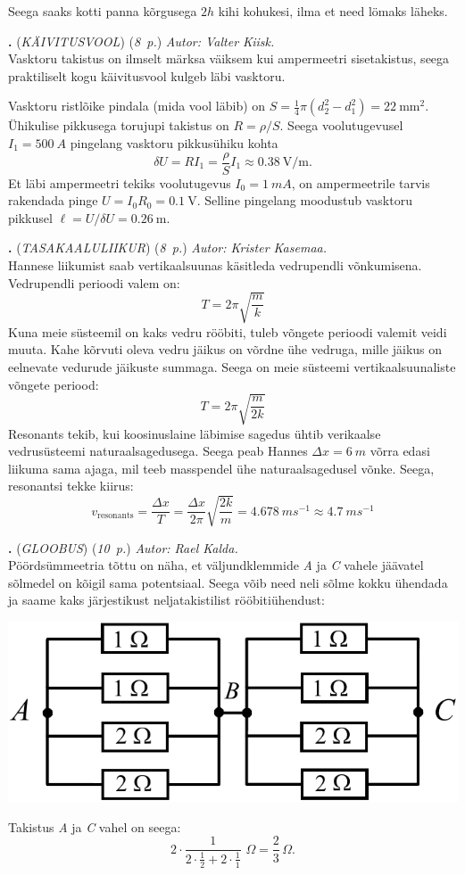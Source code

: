 \documentclass[11pt,a5paper]{article}
\newcommand{\numb}[1]{\vspace{5pt}\textbf{\large #1}}
\newcommand{\nimi}[1]{(\textsl{\small #1})}
\newcommand{\punktid}[1]{(\emph{#1~p.})}
\newcounter{ylesanne}
\newcommand{\yl}[1]{\addtocounter{ylesanne}{1}\numb{\theylesanne.} \nimi{#1} \newblock{}}
\newcommand{\autor}[1]{\emph{ Autor: #1.\\}}
\begin{document}
Seega saaks kotti panna kõrgusega $2h$ kihi kohukesi, ilma et need lömaks läheks.

\yl{KÄIVITUSVOOL}
\punktid{8}
\autor{Valter Kiisk}
Vasktoru takistus on ilmselt märksa väiksem kui ampermeetri sisetakistus, seega praktiliselt kogu käivitusvool kulgeb läbi vasktoru.

Vasktoru ristlõike pindala (mida vool läbib) on $S=\frac{1}{4}\pi(d_2^2-d_1^2)=\SI{22}{\milli\meter\squared}$. Ühikulise pikkusega torujupi takistus on $R=\rho/S$. Seega voolutugevusel $I_1=\SI{500}{A}$ pingelang vasktoru pikkusühiku kohta
\[
\delta U = RI_1 = \frac{\rho}{S}I_1\approx \SI{0.38}{\volt\per\meter}.
\]
Et läbi ampermeetri tekiks voolutugevus $I_0=\SI{1}{mA}$, on ampermeetrile tarvis rakendada pinge $U=I_0R_0=\SI{0.1}{\volt}$. Selline pingelang moodustub vasktoru pikkusel $\ell=U/\delta U=\SI{0.26}{\meter}$.

\yl{TASAKAALULIIKUR}
\punktid{8}
\autor{Krister Kasemaa}
Hannese liikumist saab vertikaalsuunas käsitleda vedrupendli võnkumisena. Vedrupendli perioodi valem on: $$T=2\pi \sqrt{\frac{m}{k}}$$ Kuna meie süsteemil on kaks vedru rööbiti, tuleb võngete perioodi valemit veidi muuta. Kahe kõrvuti oleva vedru jäikus on võrdne ühe vedruga, mille jäikus on eelnevate vedurude jäikuste summaga. Seega on meie süsteemi vertikaalsuunaliste võngete periood:
$$T = 2\pi \sqrt{\frac{m}{2k}}$$
Resonants tekib, kui koosinuslaine läbimise sagedus ühtib verikaalse vedrusüsteemi naturaalsagedusega. Seega peab Hannes $\Delta x = \SI{6}{m}$ võrra edasi liikuma sama ajaga, mil teeb masspendel ühe naturaalsagedusel võnke. Seega, resonantsi tekke kiirus:
$$v_\mathrm{resonants}=\frac{\Delta x}{T}=\frac{\Delta x}{2 \pi} \sqrt{\frac{2k}{m}} = \SI{4.678}{m s^{-1}} \approx \SI{4.7}{m s^{-1}}$$

\yl{GLOOBUS}
\punktid{10}
\autor{Rael Kalda}
\osa Pöördsümmeetria tõttu on näha, et väljundklemmide \emph{A} ja \emph{C} vahele jäävatel sõlmedel on kõigil sama potentsiaal. Seega võib need neli sõlme kokku ühendada ja saame kaks järjestikust neljatakistilist rööbitiühendust:\\
\begin{center}
\includegraphics[scale=0.8]{gloobus0.pdf}\\
\end{center}
Takistus \emph{A} ja \emph{C} vahel on seega: $$2 \cdot \frac{1}{\displaystyle{2 \cdot \frac{1}{2} + 2 \cdot \frac{1}{1}}} \,\, \SI{}\Omega=\frac{2}{3} \, \SI{}\Omega.$$
\end{document}
